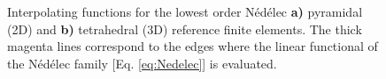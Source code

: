 \begin{figure}[t!]
    \hspace*{-.7\textwidth}
    \vspace*{7.5em}%
     \begin{subfigure}{\textwidth}\caption{ }\label{fig:Nedelec:a}\end{subfigure}\\
    \hspace*{-.7\textwidth}
     \begin{subfigure}{\textwidth}\caption{ }\label{fig:Nedelec:b}\end{subfigure}
     \vspace*{-11.5em}\\
    \centering
    \scriptsize
    \def\svgwidth{.875\textwidth}
\caption[Pyramidal and Tetrahedral Nédélec Finite Element Family of lowest Order]{Interpolating functions for the lowest order Nédélec \textbf{a)} pyramidal (2D) and \textbf{b)} tetrahedral (3D) reference finite elements. The thick magenta lines correspond to the edges where the linear functional of the Nédélec family [Eq. \eqref{eq:Nedelec}] is evaluated.}
\label{fig:Nedelec}
\end{figure}
